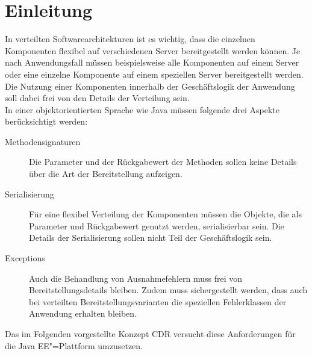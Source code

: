 \section{Einleitung\label{sec:introduction}}
In verteilten Softwarearchitekturen ist es wichtig, dass die einzelnen Komponenten flexibel auf verschiedenen Server bereitgestellt werden können. 
Je nach Anwendungsfall müssen beispielsweise alle Komponenten auf einem Server oder eine einzelne Komponente auf einem speziellen Server bereitgestellt werden. 
Die Nutzung einer Komponenten innerhalb der Geschäftslogik der Anwendung soll dabei frei von den Details der Verteilung sein.\\
In einer objektorientierten Sprache wie Java müssen folgende drei Aspekte berücksichtigt werden:
\begin{description}
\item[Methodensignaturen] Die Parameter und der Rückgabewert der Methoden sollen keine Details über die Art der Bereitstellung aufzeigen.
\item[Serialisierung] Für eine flexibel Verteilung der Komponenten müssen die Objekte, die als Parameter und Rückgabewert genutzt werden, serialisierbar sein. Die Details der Serialisierung sollen nicht Teil der Geschäftslogik sein. 
\item[Exceptions] Auch die Behandlung von Ausnahmefehlern muss frei von Bereitstellungsdetails bleiben. Zudem muss sichergestellt werden, dass auch bei verteilten Bereitstellungsvarianten die speziellen Fehlerklassen der Anwendung erhalten bleiben.    
\end{description}
Das im Folgenden vorgestellte Konzept \ac{CDR} versucht diese Anforderungen für die \ac{Java EE}"=Plattform umzusetzen.